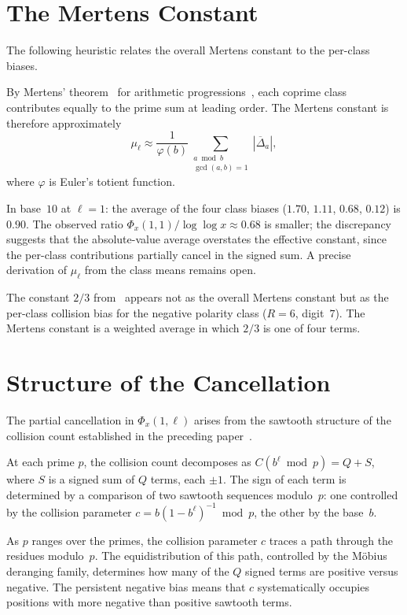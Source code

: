 \documentclass[12pt]{amsart}
\theoremstyle{definition}
\theoremstyle{remark}
\begin{document}
\section{The Mertens Constant}

The following heuristic relates the overall Mertens constant
to the per-class biases.

By Mertens' theorem~\cite{mertens} for arithmetic
progressions~\cite{davenport}, each coprime class contributes
equally to the prime sum at leading order. The Mertens constant
is therefore approximately
\[
\mu_{\ell} \approx \frac{1}{\varphi(b)}
\sum_{\substack{a \bmod b \\ \gcd(a,b)=1}}
|\overline{\Delta}_a|,
\]
where $\varphi$ is Euler's totient function.

In base~$10$ at $\ell = 1$: the average of the four class
biases ($1.70$, $1.11$, $0.68$, $0.12$) is $0.90$. The
observed ratio $\Phi_x(1,1)/\log\log x \approx 0.68$ is
smaller; the discrepancy suggests that the absolute-value
average overstates the effective constant, since the per-class
contributions partially cancel in the signed sum. A precise
derivation of $\mu_{\ell}$ from the class means remains open.

The constant $2/3$ from~\cite{paper1} appears not as the
overall Mertens constant but as the per-class collision bias
for the negative polarity class ($R = 6$, digit~$7$). The
Mertens constant is a weighted average in which $2/3$ is one
of four terms.

\section{Structure of the Cancellation}

The partial cancellation in $\Phi_x(1, \ell)$ arises from the
sawtooth structure of the collision count established in the
preceding paper~\cite{paper12}.

At each prime $p$, the collision count decomposes as
$C(b^{\ell} \bmod p) = Q + S$, where $S$ is a signed sum of
$Q$ terms, each $\pm 1$. The sign of each term is determined by
a comparison of two sawtooth sequences modulo~$p$: one
controlled by the collision parameter $c = b(1 - b^{\ell})^{-1}
\bmod p$, the other by the base~$b$.

As $p$ ranges over the primes, the collision parameter $c$
traces a path through the residues modulo~$p$. The
equidistribution of this path, controlled by the M\"obius
deranging family, determines how many of the $Q$ signed terms
are positive versus negative. The persistent negative bias means
that $c$ systematically occupies positions with more negative
than positive sawtooth terms.
\end{document}
